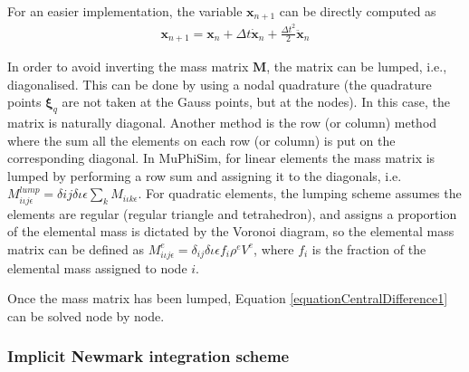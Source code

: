 \documentclass[oneside,11pt,times]{book}
\begin{document}
For an easier implementation, the variable $\bm{x}_{n+1}$ can be directly computed as
%
\begin{eqnarray}
 & \displaystyle{\bm{x}_{n+1} = \bm{x}_{n} + \Delta t \dot{\bm{x}}_{n} + \frac{\Delta t^2}{2} \ddot{\bm{x}}_{n}}  &
   \label{equationCorrection}
\end{eqnarray}
%

In order to avoid inverting the mass matrix $\bm{M}$, the matrix can be lumped, i.e., diagonalised. This can be done by using a nodal quadrature (the quadrature points $\bm{\xi}_q$ are not taken at the Gauss points, but at the nodes). In this case, the matrix is naturally diagonal. Another method is the row (or column) method where the sum all the elements on each row (or column) is put on the corresponding diagonal. In MuPhiSim, for linear elements the mass matrix is lumped by performing a row sum and assigning it to the diagonals, i.e. $M^{lump}_{i\iota j\epsilon}=\delta{ij}\delta{\iota\epsilon}\sum_{k}M_{i\iota k\epsilon}$. For quadratic elements, the lumping scheme assumes the elements are regular (regular triangle and tetrahedron), and assigns a proportion of the elemental mass is dictated by the Voronoi diagram, so the elemental mass matrix can be defined as $M^{e}_{i\iota j\epsilon}=\delta_{ij}\delta{\iota\epsilon}f_i \rho^{e} V^{e}$, where $f_i$ is the fraction of the elemental mass assigned to node $i$.

Once the mass matrix has been lumped, Equation \eqref{equationCentralDifference1} can be solved node by node.

\subsubsection{Implicit Newmark integration scheme}
 \label{subsectionImplicitNewmarkScheme}
\end{document}
